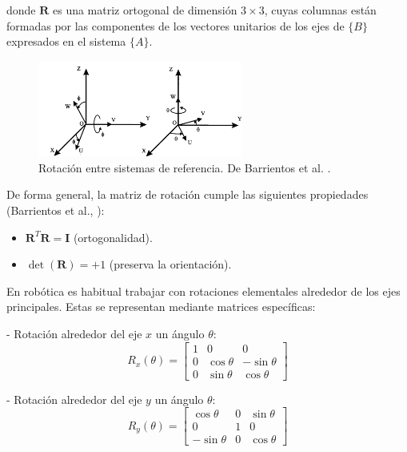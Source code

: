 \documentclass[12pt,a4paper,oneside]{report}
\begin{document}
donde $\mathbf{R}$ es una matriz ortogonal de dimensión $3 \times 3$, cuyas
columnas están formadas por las componentes de los vectores unitarios de los
ejes de $\{B\}$ expresados en el sistema $\{A\}$.  

\begin{figure}[h]
\centering
\includegraphics[width=0.6\textwidth]{figuras/rotacion2.png}
\caption{Rotación entre sistemas de referencia. De Barrientos et al. \cite{barrientos2014}.}
\label{fig:Rotacion_sistemas_referencia}
\end{figure}

De forma general, la matriz de rotación cumple las siguientes propiedades
(Barrientos et al., \cite{barrientos2014}):  
\begin{itemize}
    \item $\mathbf{R}^T \mathbf{R} = \mathbf{I}$ (ortogonalidad).  
    \item $\det(\mathbf{R}) = +1$ (preserva la orientación).  
\end{itemize}

En robótica es habitual trabajar con rotaciones elementales alrededor de los
ejes principales. Estas se representan mediante matrices específicas:  

- Rotación alrededor del eje $x$ un ángulo $\theta$:  
\begin{equation}
R_x(\theta) =
\begin{bmatrix}
1 & 0 & 0 \\
0 & \cos \theta & -\sin \theta \\
0 & \sin \theta & \cos \theta
\end{bmatrix}
\label{eq:rotacion_matrizX}
\end{equation}

- Rotación alrededor del eje $y$ un ángulo $\theta$:  
\begin{equation}
R_y(\theta) =
\begin{bmatrix}
\cos \theta & 0 & \sin \theta \\
0 & 1 & 0 \\
-\sin \theta & 0 & \cos \theta
\end{bmatrix}
\label{eq:rotacion_matrizY}
\end{equation}
\end{document}
